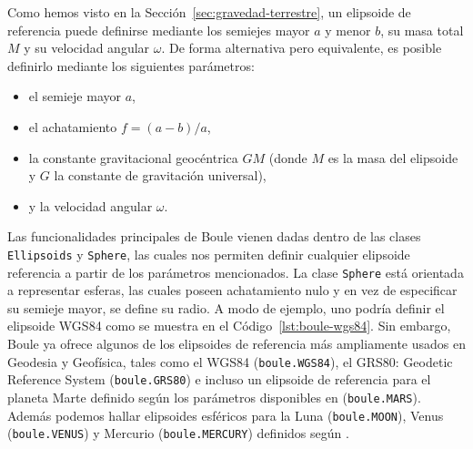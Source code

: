 Como hemos visto en la Sección~\ref{sec:gravedad-terrestre}, un elipsoide de
referencia puede definirse mediante los semiejes mayor $a$ y menor $b$, su masa
total $M$ y su velocidad angular $\omega$.
De forma alternativa pero equivalente, es posible definirlo mediante los
siguientes parámetros:
%
\begin{itemize}
    \item el semieje mayor $a$,
    \item el achatamiento $f = (a - b) / a$,
    \item la constante gravitacional geocéntrica $GM$ (donde $M$ es la masa
        del elipsoide y $G$ la constante de gravitación universal),
    \item y la velocidad angular $\omega$.
\end{itemize}

Las funcionalidades principales de Boule vienen dadas dentro de las clases
\texttt{Ellipsoids} y \texttt{Sphere}, las cuales nos permiten definir
cualquier elipsoide referencia a partir de los parámetros mencionados.
La clase \texttt{Sphere} está orientada a representar esferas, las cuales
poseen achatamiento nulo y en vez de especificar su semieje mayor, se define su
radio.
A modo de ejemplo, uno podría definir el elipsoide WGS84 como se muestra en el
Código~\ref{lst:boule-wgs84}.
Sin embargo, Boule ya ofrece algunos de los elipsoides de referencia más
ampliamente usados en Geodesia y Geofísica, tales como el WGS84
(\texttt{boule.WGS84}), el GRS80: Geodetic Reference System
(\texttt{boule.GRS80}) e incluso un elipsoide de referencia para el planeta
Marte definido según los parámetros disponibles en \citet{ardalan2009}
(\texttt{boule.MARS}).
Además podemos hallar elipsoides esféricos para la Luna (\texttt{boule.MOON}),
Venus (\texttt{boule.VENUS}) y Mercurio (\texttt{boule.MERCURY}) definidos
según \citet{wieczorek2015}.



